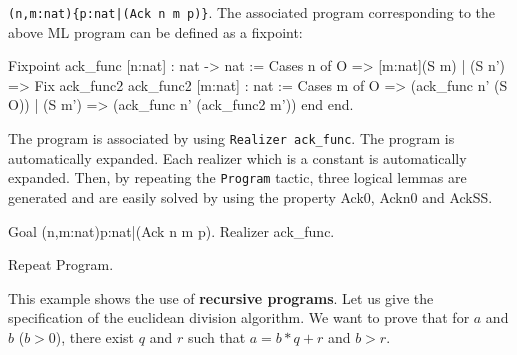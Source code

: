\verb!(n,m:nat){p:nat|(Ack n m p)}!.
The associated {\real} program corresponding to the above ML program can be defined as a fixpoint:
\begin{coq_example*}
Fixpoint ack_func [n:nat] : nat -> nat :=
  Cases n of
      O    => [m:nat](S m)
  | (S n') => Fix ack_func2 {ack_func2 [m:nat] : nat :=
                 Cases m of
                   O      => (ack_func n' (S O))
                 | (S m') => (ack_func n' (ack_func2 m')) 
                 end} 
  end.
\end{coq_example*}
The program is associated by using \verb=Realizer ack_func=. The
program is automatically expanded. Each realizer which is a constant
is automatically expanded. Then, by repeating the \verb=Program=
tactic, three logical lemmas are generated and are easily solved by
using the property Ack0, Ackn0 and AckSS.
\begin{coq_eval}
Goal (n,m:nat){p:nat|(Ack n m p)}.
Realizer ack_func.
\end{coq_eval}
\begin{coq_example}
Repeat Program.
\end{coq_example}


This example shows the use of {\bf recursive programs}. Let us
give the specification of the euclidean division algorithm. We want to
prove that for $a$ and $b$ ($b>0$), there exist $q$ and $r$ such that
$a=b*q+r$ and $b>r$.

